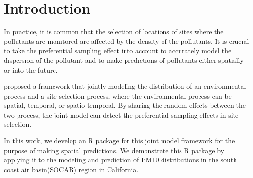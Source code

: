 \section{Introduction}
In practice, it is common that the selection of locations of sites where the pollutants 
are monitored are affected by the density of the pollutants. It is crucial to take the preferential 
sampling effect into account to accurately model the dispersion of the pollutant and to make 
predictions of pollutants either spatially or into the future.

\cite{Watson2019_pref_samp} proposed a framework that jointly modeling the distribution of an
environmental process and a site-selection process, where the environmental process can be spatial,
temporal, or spatio-temporal. By sharing the random effects between the two process, the joint
model can detect the preferential sampling effects in site selection. 

In this work, we develop an R package for this joint model framework for the purpose of making
spatial predictions. We demonstrate this R package by applying it to the modeling and prediction of
PM10 distributions in the south coast air basin(SOCAB) region in California. 